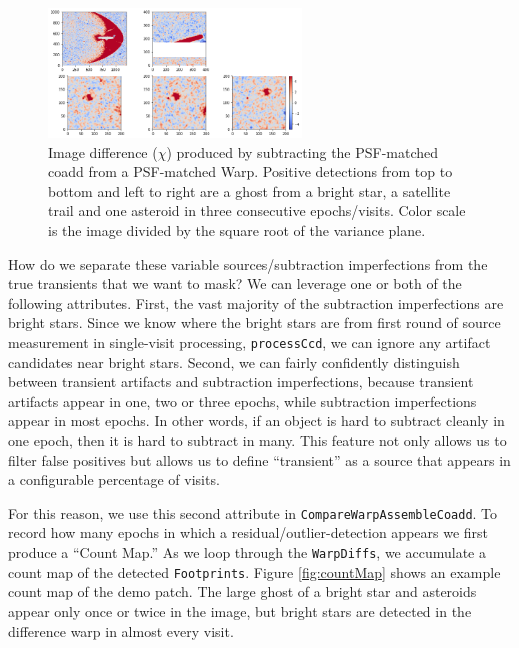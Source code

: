 \documentclass[DM,authoryear,toc]{lsstdoc}
\begin{document}
\begin{figure}
\begin{centering}
\includegraphics[width=0.6\textwidth]{figures/artifacts.png}
\par\end{centering}
\caption{\label{fig:artifacts} Image difference ($\chi$) produced by subtracting the PSF-matched coadd from a PSF-matched Warp. Positive detections from top to bottom and left to right are a ghost from a bright star, a satellite trail and one asteroid in three consecutive epochs/visits. Color scale is the image divided by the square root of the variance plane.}
\end{figure}

How do we separate these variable sources/subtraction imperfections from the true transients that we want to mask?
We can leverage one or both of the following attributes.
First, the vast majority of the subtraction imperfections are bright stars.
Since we know where the bright stars are from first round of source measurement in single-visit processing, \texttt{processCcd}, we can ignore any artifact candidates near bright stars.
Second, we can fairly confidently distinguish between transient artifacts and subtraction imperfections, because transient artifacts appear in one, two or three epochs, while subtraction imperfections appear in most epochs.
In other words, if an object is hard to subtract cleanly in one epoch, then it is hard to subtract in many.
This feature not only allows us to filter false positives but allows us to define ``transient'' as a source that appears in a configurable percentage of visits.

For this reason,  we use this second attribute in \texttt{CompareWarpAssembleCoadd}.
To record how many epochs in which a residual/outlier-detection appears we first produce a ``Count Map.''
As we loop through the  \texttt{WarpDiffs}, we accumulate a count map of the detected \texttt{Footprints}.
Figure \ref{fig:countMap} shows an example count map of the demo patch. The large ghost of a bright star and asteroids appear only once or twice in the image, but bright stars are detected in the difference warp in almost every visit.
\end{document}
